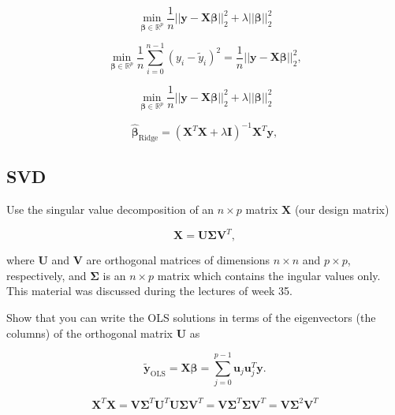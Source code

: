 \documentclass[twoside,11pt]{report}
\begin{document}
$$
{\displaystyle \min_{\mathbf{\beta}\in
{\mathbb{R}}^{p}}}\frac{1}{n}\vert\vert \mathbf{y}-\mathbf{X}\mathbf{\beta}\vert\vert_2^2+\lambda\vert\vert \mathbf{\beta}\vert\vert_2^2
$$



$$
{\displaystyle \min_{\mathbf{\beta}\in
{\mathbb{R}}^{p}}}\frac{1}{n}\sum_{i=0}^{n-1}\left(y_i-\tilde{y}_i\right)^2=\frac{1}{n}\vert\vert \mathbf{y}-\mathbf{X}\mathbf{\beta}\vert\vert_2^2,
$$




$$
{\displaystyle \min_{\mathbf{\beta}\in
{\mathbb{R}}^{p}}}\frac{1}{n}\vert\vert \mathbf{y}-\mathbf{X}\mathbf{\beta}\vert\vert_2^2+\lambda\vert\vert \mathbf{\beta}\vert\vert_2^2
$$









$$
\hat{\mathbf{\beta}}_{\mathrm{Ridge}} = \left(\mathbf{X}^T\mathbf{X}+\lambda\mathbf{I}\right)^{-1}\mathbf{X}^T\mathbf{y},
$$





%
\subsection*{SVD}
\label{app:svd}



Use the singular value decomposition of an $n\times p$ matrix $\mathbf{X}$ (our design matrix)

$$
\mathbf{X}=\mathbf{U}\mathbf{\Sigma}\mathbf{V}^T,
$$


where $\mathbf{U}$ and $\mathbf{V}$ are orthogonal matrices of dimensions
$n\times n$ and $p\times p$, respectively, and $\mathbf{\Sigma}$ is an
$n\times p$ matrix which contains the ingular values only. This material was discussed during the lectures of week 35.

Show that you can write the 
OLS solutions in terms of the eigenvectors (the columns) of the orthogonal matrix  $\mathbf{U}$ as


$$
\tilde{\mathbf{y}}_{\mathrm{OLS}}=\mathbf{X}\mathbf{\beta}  = \sum_{j=0}^{p-1}\mathbf{u}_j\mathbf{u}_j^T\mathbf{y}.
$$


$$
\mathbf{X}^T\mathbf{X} = \mathbf{V}\mathbf{\Sigma}^T\mathbf{U}^T\mathbf{U}\mathbf{\Sigma}\mathbf{V}^T = \mathbf{V}\mathbf{\Sigma}^T\mathbf{\Sigma}\mathbf{V}^T = \mathbf{V}\mathbf{\Sigma}^2\mathbf{V}^T
$$
\end{document}

